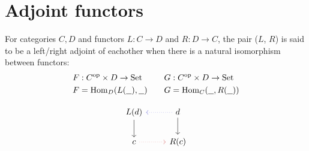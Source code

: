 \section{Adjoint functors}

\begin{definition}\label{def:adjoint_hom}
  For categories $C, D$ and functors $L: C\to D$ and $R: D\to C$, the pair ($L$,
  $R$) is said to be a left/right adjoint of eachother when there is a natural
  isomorphism between functors: \parencite{fong_spivak:7sketches}
  \[
    \begin{aligned}
      F&: C^{\mathrm{op}} \times D \to \mathrm{Set}\\
      F&=\mathrm{Hom}_D(L(\underline{\ \ }), \underline{\ \ })
    \end{aligned}
    \qquad
    \begin{aligned}
      G&: C^{\mathrm{op}} \times D \to \mathrm{Set}\\
      G&=\mathrm{Hom}_C(\underline{\ \ }, R(\underline{\ \ }))
    \end{aligned}
  \]

  \[\begin{tikzcd}
    {L(d)} & d \\
    c & {R(c)}
    \arrow[from=1-2, to=2-2]
    \arrow[from=1-1, to=2-1]
    \arrow[draw={rgb,255:red,92;green,92;blue,214}, dotted, from=1-2, to=1-1]
    \arrow[draw={rgb,255:red,214;green,92;blue,92}, dotted, from=2-1, to=2-2]
  \end{tikzcd}\]


\end{definition}
